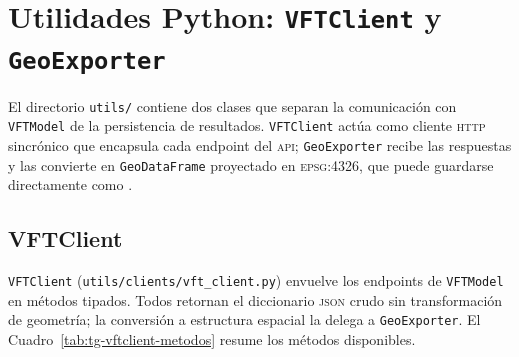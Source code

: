 
\section{Utilidades Python: \texttt{VFTClient} y \texttt{GeoExporter}}
\label{anx:tg-utils}

El directorio \texttt{utils/} contiene dos clases que separan la comunicación
con \texttt{VFTModel} de la persistencia de resultados. \texttt{VFTClient} actúa
como cliente \textsc{http} sincrónico que encapsula cada endpoint del
\textsc{api}; \texttt{GeoExporter} recibe las respuestas y las convierte en
\texttt{GeoDataFrame} proyectado en \textsc{epsg}:4326, que puede guardarse
directamente como \geojson{}.

\subsection*{VFTClient}

\texttt{VFTClient} (\texttt{utils/clients/vft\_client.py}) envuelve los
endpoints de \texttt{VFTModel} en métodos tipados. Todos retornan el diccionario
\textsc{json} crudo sin transformación de geometría; la conversión a estructura
espacial la delega a \texttt{GeoExporter}. El
Cuadro~\ref{tab:tg-vftclient-metodos} resume los métodos disponibles.

